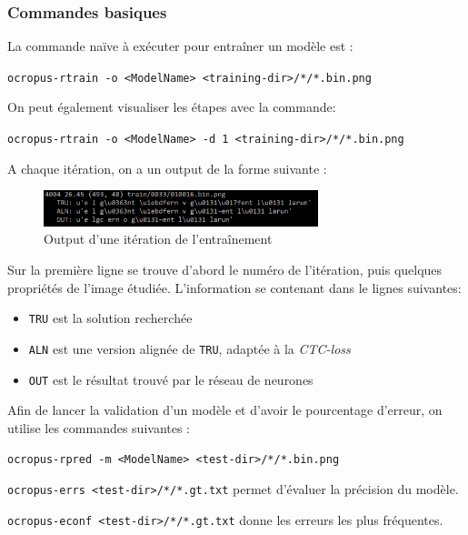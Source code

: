 \documentclass{report}
\begin{document}
\subsubsection{Commandes basiques}

La commande naïve à exécuter pour entraîner un modèle est :

\begin{center}
    \texttt{ocropus-rtrain -o <ModelName> <training-dir>/*/*.bin.png}
\end{center}

On peut également visualiser les étapes avec la commande:

\begin{center}
    \texttt{ocropus-rtrain -o <ModelName> -d 1 <training-dir>/*/*.bin.png}
\end{center}

\noindent A chaque itération, on a un output de la forme suivante : 

\begin{figure}[!h] 
    \center
    \includegraphics[width=8cm]{screen_output.png}
    \caption{Output d'une itération de l'entraînement}
    \label{API}
\end{figure}

Sur la première ligne se trouve d'abord le numéro de l'itération, puis quelques propriétés de l'image étudiée. L'information se contenant dans le lignes suivantes:
\begin{itemize}
    \item \texttt{TRU} est la solution recherchée
    \item \texttt{ALN} est une version alignée de \texttt{TRU}, adaptée à la \textit{CTC-loss}
    \item \texttt{OUT} est le résultat trouvé par le réseau de neurones
\end{itemize}

Afin de lancer la validation d'un modèle et d'avoir le pourcentage d'erreur, on utilise les commandes suivantes :

\begin{center}
    \texttt{ocropus-rpred -m <ModelName> <test-dir>/*/*.bin.png}

    \texttt{ocropus-errs <test-dir>/*/*.gt.txt} permet d'évaluer la précision du modèle.

    \texttt{ocropus-econf <test-dir>/*/*.gt.txt} donne les erreurs les plus fréquentes.
\end{center}
\end{document}
